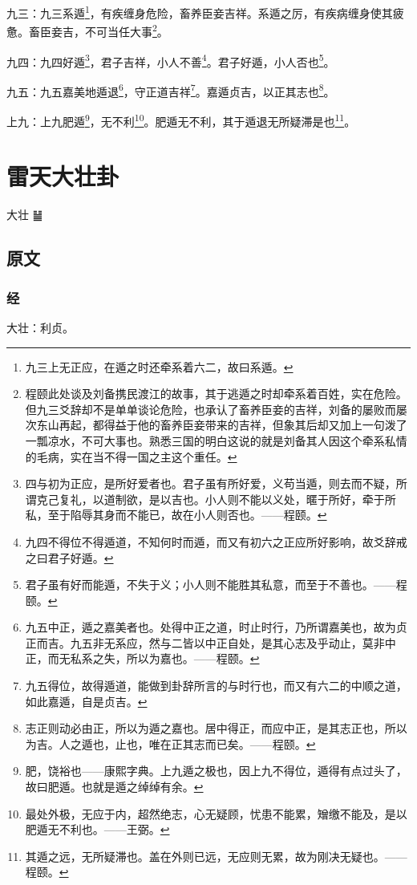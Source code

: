 \documentclass[12pt,oneside]{book}
\begin{document}
九三：九三系遁\footnote{九三上无正应，在遁之时还牵系着六二，故曰系遁。}，有疾缠身危险，畜养臣妾吉祥。系遁之厉，有疾病缠身使其疲惫。畜臣妾吉，不可当任大事\footnote{程颐此处谈及刘备携民渡江的故事，其于逃遁之时却牵系着百姓，实在危险。但九三爻辞却不是单单谈论危险，也承认了畜养臣妾的吉祥，刘备的屡败而屡次东山再起，都得益于他的畜养臣妾带来的吉祥，但象其后却又加上一句泼了一瓢凉水，不可大事也。熟悉三国的明白这说的就是刘备其人因这个牵系私情的毛病，实在当不得一国之主这个重任。}。

九四：九四好遁\footnote{四与初为正应，是所好爱者也。君子虽有所好爱，义苟当遁，则去而不疑，所谓克己复礼，以道制欲，是以吉也。小人则不能以义处，暱于所好，牵于所私，至于陷辱其身而不能已，故在小人则否也。——程颐。}，君子吉祥，小人不善\footnote{九四不得位不得遁道，不知何时而遁，而又有初六之正应所好影响，故爻辞戒之曰君子好遁。}。君子好遁，小人否也\footnote{君子虽有好而能遁，不失于义；小人则不能胜其私意，而至于不善也。——程颐。}。

九五：九五嘉美地遁退\footnote{九五中正，遁之嘉美者也。处得中正之道，时止时行，乃所谓嘉美也，故为贞正而吉。九五非无系应，然与二皆以中正自处，是其心志及乎动止，莫非中正，而无私系之失，所以为嘉也。——程颐。}，守正道吉祥\footnote{九五得位，故得遁道，能做到卦辞所言的与时行也，而又有六二的中顺之道，如此嘉遁，自是贞吉。}。嘉遁贞吉，以正其志也\footnote{志正则动必由正，所以为遁之嘉也。居中得正，而应中正，是其志正也，所以为吉。人之遁也，止也，唯在正其志而已矣。——程颐。}。

上九：上九肥遁\footnote{肥，饶裕也——康熙字典。上九遁之极也，因上九不得位，遁得有点过头了，故曰肥遁。也就是遁之绰绰有余。}，无不利\footnote{最处外极，无应于内，超然绝志，心无疑顾，忧患不能累，矰缴不能及，是以肥遁无不利也。——王弼。}。肥遁无不利，其于遁退无所疑滞是也\footnote{其遁之远，无所疑滞也。盖在外则已远，无应则无累，故为刚决无疑也。——程颐。}。



\chapter{雷天大壮卦}
大壮 {\Large ䷡}

\section{原文}

\subsection{经}
大壮：利贞。
\end{document}
